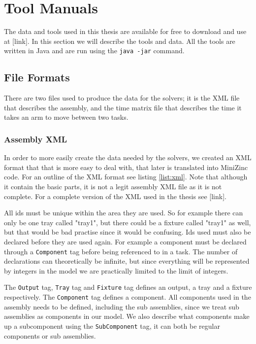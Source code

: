 \chapter{Tool Manuals}\label{app:tool_manuals}
The data and tools used in this thesis are available for free to download and use at [link]. In this section we will describe the tools and data. All the tools are written in Java and are run using the \texttt{java -jar} command.

\section{File Formats}
There are two files used to produce the data for the solvers; it is the XML file that describes the assembly, and the time matrix file that describes the time it takes an arm to move between two tasks.
\subsection{Assembly XML}
In order to more easily create the data needed by the solvers, we created an XML format that that is more easy to deal with, that later is translated into MiniZinc code. For an outline of the XML format see listing \ref{list:xml}. Note that although it contain the basic parts, it is not a legit assembly XML file as it is not complete. For a complete version of the XML used in the thesis see [link].

All ids must be unique within the area they are used. So for example there can only be one tray called "tray1", but there could be a fixture called "tray1" as well, but that would be bad practise since it would be confusing. Ids used must also be declared before they are used again. For example a component must be declared through a \texttt{Component} tag before being referenced to in a task. The number of declarations can theoretically be infinite, but since everything will be represented by integers in the model we are practically limited to the limit of integers.

The \texttt{Output} tag, \texttt{Tray} tag and \texttt{Fixture} tag defines an output, a tray and a fixture respectively. The \texttt{Component} tag defines a component. All components used in the assembly needs to be defined, including the sub assemblies, since we treat sub assemblies as components in our model. We also describe what components make up a subcomponent using the \texttt{SubComponent} tag, it can both be regular components or sub assemblies.

